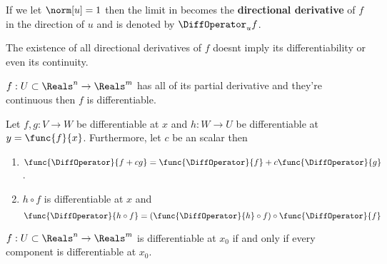 \begin{definition}
    If we let \(\norm[u] = 1\) then the limit in  becomes the \textbf{directional derivative} of \(f\) in the direction of \(u\) and is denoted by \(\DiffOperator_u f\).
\end{definition}

\begin{remark}
    The existence of all directional derivatives of \(f\) doesnt imply its differentiability or even its continuity.
\end{remark}

\begin{theorem}
    \(f : U \subset \Reals^n \to \Reals^m\) has all of its partial derivative and they're continuous then \(f\) is differentiable.
\end{theorem}

\begin{proposition}
    Let \(f,g : V \to W\) be differentiable at \(x\) and \(h : W \to U\) be differentiable at \(y = \func{f}{x}\). Furthermore, let \(c\) be an scalar then
    \begin{enumerate}
        \item \(\func{\DiffOperator}{ f + cg} = \func{\DiffOperator}{f} + c \func{\DiffOperator}{g}\).
        \item  \(h \circ f\) is differentiable at \(x\) and
              \begin{equation*}
                  \func{\DiffOperator}{ h \circ f} =  \left( \func{\DiffOperator}{h}\circ f \right) \circ \func{\DiffOperator}{ f}
              \end{equation*}
    \end{enumerate}
\end{proposition}

\begin{proposition}
    \(f : U \subset \Reals^n \to \Reals^m\) is differentiable at \(x_0\) if and only if every component is differentiable at \(x_0\).
\end{proposition}

